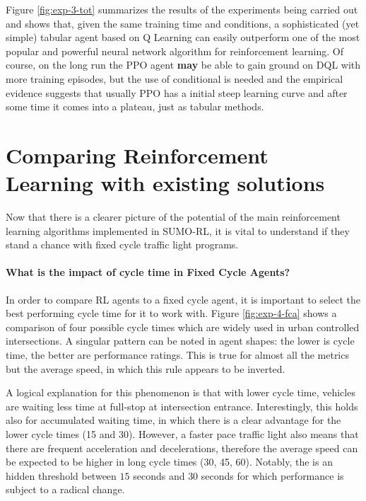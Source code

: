 Figure \ref{fig:exp-3-tot} summarizes the results of the experiments being carried out and shows that, given the same training time and conditions, a sophisticated (yet simple) tabular agent based on Q Learning can easily outperform one of the most popular and powerful neural network algorithm for reinforcement learning.
Of course, on the long run the PPO agent \textbf{may} be able to gain ground on DQL with more training episodes, but the use of conditional is needed and the empirical evidence \cite{kozlica2023deep} suggests that usually PPO has a initial steep learning curve and after some time it comes into a plateau, just as tabular methods.


\section{Comparing Reinforcement Learning with existing solutions}

Now that there is a clearer picture of the potential of the main reinforcement learning algorithms implemented in SUMO-RL, it is vital to understand if they stand a chance with fixed cycle traffic light programs.

\paragraph{What is the impact of cycle time in Fixed Cycle Agents?}

In order to compare RL agents to a fixed cycle agent, it is important to select the best performing cycle time for it to work with. Figure \ref{fig:exp-4-fca} shows a comparison of four possible cycle times which are widely used in urban controlled intersections.
A singular pattern can be noted in agent shapes: the lower is cycle time, the better are performance ratings.
This is true for almost all the metrics but the average speed, in which this rule appears to be inverted.

A logical explanation for this phenomenon is that with lower cycle time, vehicles are waiting less time at full-stop at intersection entrance.
Interestingly, this holds also for accumulated waiting time, in which there is a clear advantage for the lower cycle times (15 and 30).
However, a faster pace traffic light also means that there are frequent acceleration and decelerations, therefore the average speed can be expected to be higher in long cycle times (30, 45, 60).
Notably, the is an hidden threshold between $15$ seconds and $30$ seconds for which performance is subject to a radical change.

